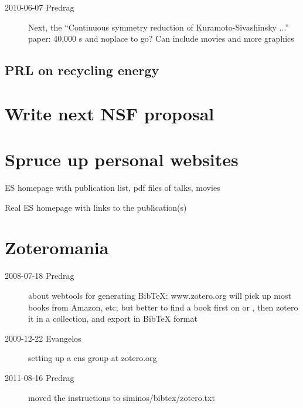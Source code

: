 \begin{description}

\item[2010-06-07 Predrag] Next, the
``Continuous symmetry reduction of Kuramoto-Sivashinsky ...'' paper:
40,000 \rpo s and noplace to go?
Can include movies and more graphics

\end{description}

\subsection{PRL on recycling energy}

\section{Write next NSF proposal }

\section{Spruce up personal websites}

ES homepage with publication list, pdf files of talks, movies

Real ES homepage with links to the publication(s)

\section{Zoteromania}

\begin{description}

\item[2008-07-18 Predrag] about webtools for generating BibTeX:
www.zotero.org
        will pick up most books from Amazon, etc; but
        better to find a book first on
          or
, then zotero it
          in a collection, and export in BibTeX format

\item[2009-12-22 Evangelos]
setting up a cns group at zotero.org

\item[2011-08-16 Predrag] moved the instructions to siminos/bibtex/zotero.txt

\end{description}
